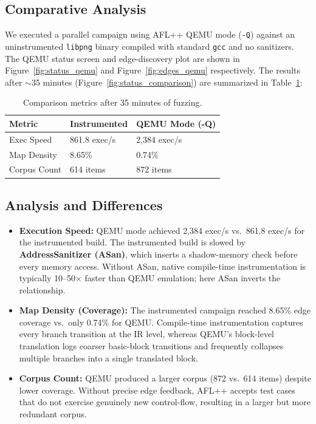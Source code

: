 \documentclass[letterpaper,twocolumn,10pt]{article}
\begin{document}
\subsection{Comparative Analysis}
We executed a parallel campaign using AFL++ QEMU mode (\texttt{-Q}) against an
uninstrumented \texttt{libpng} binary compiled with standard \texttt{gcc} and no
sanitizers. The QEMU status screen and edge-discovery plot are shown in
Figure~\ref{fig:status_qemu} and Figure~\ref{fig:edges_qemu} respectively.
The results after $\sim$35 minutes (Figure~\ref{fig:status_comparison})
are summarized in Table~\ref{tab:qemu_comparison}:

\begin{table}[h]
\centering
\small
\begin{tabular}{l l l}
\hline
\textbf{Metric} & \textbf{Instrumented} & \textbf{QEMU Mode (-Q)} \\ \hline
Exec Speed      & 861.8 exec/s          & 2,384 exec/s            \\
Map Density     & 8.65\%                & 0.74\%                  \\
Corpus Count    & 614 items             & 872 items               \\ \hline
\end{tabular}
\caption{Comparison metrics after 35 minutes of fuzzing.}
\label{tab:qemu_comparison}
\end{table}

\subsection{Analysis and Differences}
\begin{itemize}[leftmargin=*]
    \item \textbf{Execution Speed:} QEMU mode achieved 2,384 exec/s vs.\ 861.8 exec/s
    for the instrumented build. The instrumented build is slowed by
    \textbf{AddressSanitizer (ASan)}, which inserts a shadow-memory check before
    every memory access. Without ASan, native compile-time instrumentation is
    typically 10--50$\times$ faster than QEMU emulation; here ASan inverts the
    relationship.
    \item \textbf{Map Density (Coverage):} The instrumented campaign reached
    8.65\% edge coverage vs.\ only 0.74\% for QEMU. Compile-time instrumentation
    captures every branch transition at the IR level, whereas QEMU's block-level
    translation logs coarser basic-block transitions and frequently collapses
    multiple branches into a single translated block.
    \item \textbf{Corpus Count:} QEMU produced a larger corpus (872 vs.\ 614
    items) despite lower coverage. Without precise edge feedback, AFL++ accepts
    test cases that do not exercise genuinely new control-flow, resulting in a
    larger but more redundant corpus.
\end{itemize}
\end{document}
